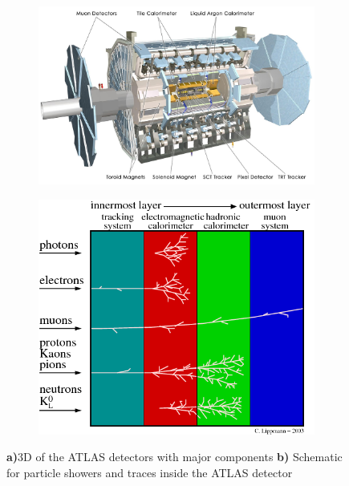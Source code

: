 \documentclass[../Bachelorarbeit.tex]{subfiles}
\begin{document}
\begin{figure}[h]
    \begin{subfigure}{0.59\textwidth}
        \centering
        \includegraphics[width=\textwidth]{images/0803012_05-A4-at-144-dpi.jpg}
        \caption{}
    \end{subfigure}
    \begin{subfigure}{0.40\textwidth}
        \centering
        \includegraphics[width=\textwidth]{images/experiment_atlas.png}
        \caption{}
    \end{subfigure}
    \caption{\textbf{a)}3D of the ATLAS detectors with major components \cite{JoaoPequenao.27.03.2008} \textbf{b)} Schematic for particle showers and traces inside the ATLAS detector \cite{Lippmann.2012}}
    \label{fig:ALTAS_detector}
\end{figure}
\end{document}
